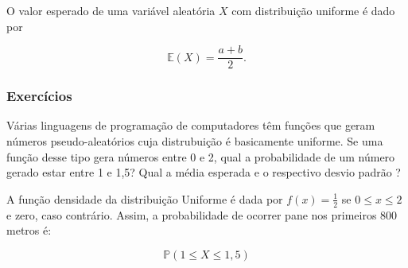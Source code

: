 \documentclass[10pt,a4paper]{article}
\begin{document}
O valor esperado de uma variável aleatória $ X $ com distribuição uniforme é dado por

\[\mathbb{E}(X) = \frac{a+b}{2}.\]

\subsubsection{Exercícios}

\begin{ex}
	Várias linguagens de programação de computadores têm funções que geram números pseudo-aleatórios cuja distrubuição é basicamente uniforme. Se uma função desse tipo gera números entre 0 e 2, qual a probabilidade de um número gerado estar entre 1 e 1,5? Qual a média esperada e o respectivo desvio padrão ?
	
	\begin{sol}
		A função densidade da distribuição Uniforme é dada por $ f(x)=\frac{1}{2} $ se  $ 0\leq x\leq 2 $ e zero, caso contrário. Assim, a probabilidade de ocorrer pane nos primeiros 800 metros é:
		
		\[\mathbb{P}(1\leq X \leq 1,5) \]
	\end{sol}
\end{ex}
\end{document}
